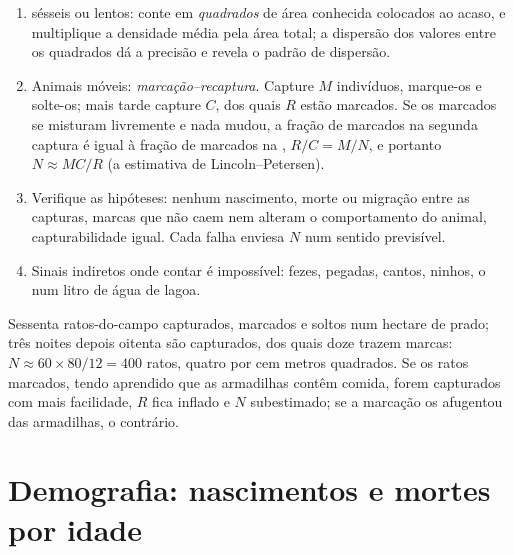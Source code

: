 \begin{method}\label{met:b1:populations:counting}
\begin{enumerate}
  \item {} sésseis ou lentos: conte em \emph{quadrados} de
        área conhecida colocados ao acaso, e multiplique a densidade
        média pela área total; a dispersão dos valores entre os
        quadrados dá a precisão e revela o padrão de dispersão.
  \item Animais móveis: \emph{marcação--recaptura}. Capture $M$
        indivíduos, marque-os e solte-os; mais tarde capture $C$, dos
        quais $R$ estão marcados. Se os marcados se misturam
        livremente e nada mudou, a fração de marcados na segunda
        captura é igual à fração de marcados na ,
        $R/C = M/N$, e portanto $N \approx MC/R$ (a estimativa de
        Lincoln--Petersen).
  \item Verifique as hipóteses: nenhum nascimento, morte ou migração
        entre as capturas, marcas que não caem nem alteram o
        comportamento do animal, capturabilidade igual. Cada falha
        enviesa $N$ num sentido previsível.
  \item Sinais indiretos onde contar é impossível: fezes, pegadas,
        cantos, ninhos, o  num litro de água de lagoa.
\end{enumerate}
\end{method}

\begin{example}\label{ex:b1:populations:voles}
Sessenta ratos-do-campo capturados, marcados e soltos num hectare de
prado; três noites depois oitenta são capturados, dos quais doze trazem
marcas: $N \approx 60\times 80/12 = 400$ ratos, quatro por cem metros
quadrados. Se os ratos marcados, tendo aprendido que as armadilhas
contêm comida, forem capturados com mais facilidade, $R$ fica inflado
e $N$ subestimado; se a marcação os afugentou das armadilhas, o
contrário.
\end{example}

\section{Demografia: nascimentos e mortes por idade}

